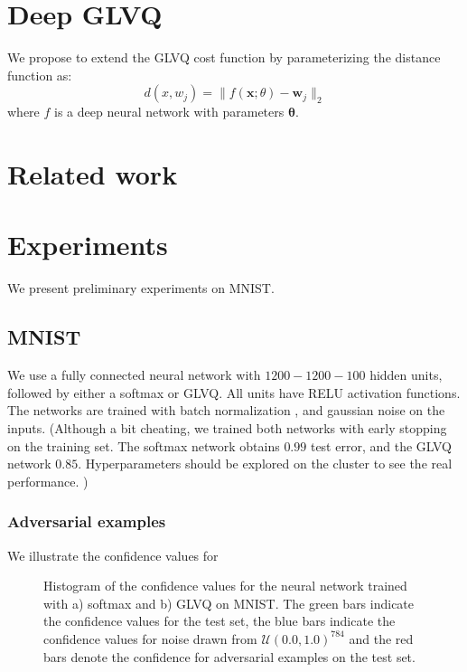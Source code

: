 \documentclass{article} %
\begin{document}

\section{Deep GLVQ}
We propose to extend the GLVQ cost function by parameterizing the distance function as:
\begin{equation}
 d(x, w_j) = \|f(\mathbf{x}; \theta) - \mathbf{w}_j\|_2
\end{equation}
where $f$ is a deep neural network with parameters $\mathbf{\theta}$. 


\section{Related work}


\section{Experiments}
We present preliminary experiments on MNIST. 

\subsection{MNIST}
We use a fully connected neural network with $1200-1200-100$ hidden units, followed by either a softmax or GLVQ. All units have RELU activation functions. The networks are trained with batch normalization \cite{DBLP:journals/corr/IoffeS15}, and gaussian noise on the inputs. (Although a bit cheating, we trained both networks with early stopping on the training set. The softmax network obtains $0.99$ test error, and the GLVQ network $0.85$. Hyperparameters should be explored on the cluster to see the real performance. )   

\subsubsection{Adversarial examples}
We illustrate the confidence values for 

\begin{figure}[ht]
\caption{Histogram of the confidence values for the neural network trained with a) softmax and b) GLVQ on MNIST. The green bars indicate the confidence values for the test set, the blue bars indicate the confidence values for noise drawn from $\mathcal{U}(0.0, 1.0)^{784}$ and the red bars denote the confidence for adversarial examples on the test set. }
\end{figure}
\end{document}
